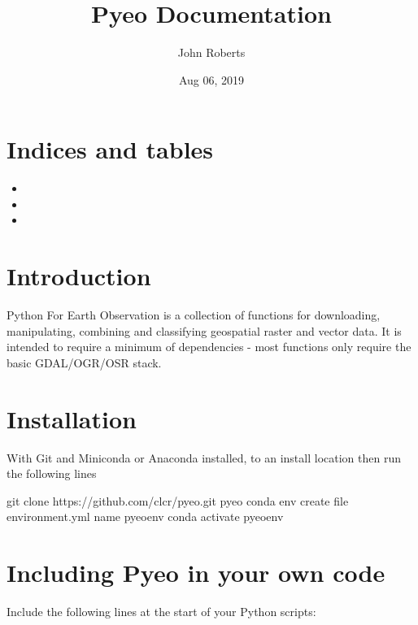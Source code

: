 \documentclass[letterpaper,10pt,english]{sphinxmanual}
\title{Pyeo Documentation}
\date{Aug 06, 2019}
\author{John Roberts}
\begin{document}
\pagestyle{empty}
\sphinxmaketitle
\pagestyle{plain}
\sphinxtableofcontents
\pagestyle{normal}
\label{\detokenize{index::doc}}



\chapter{Indices and tables}
\label{\detokenize{index:indices-and-tables}}\begin{itemize}
\item {} 

\item {} 

\item {} 

\end{itemize}


\chapter{Introduction}
\label{\detokenize{index:introduction}}
Python For Earth Observation is a collection of functions for downloading, manipulating, combining and classifying
geospatial raster and vector data. It is intended to require a minimum of dependencies - most functions only require
the basic GDAL/OGR/OSR stack.


\chapter{Installation}
\label{\detokenize{index:installation}}
With Git and Miniconda or Anaconda installed,  to an install location then run the following lines

\begin{sphinxVerbatim}[commandchars=\\\{\}]
git clone https://github.com/clcr/pyeo.git
 pyeo
conda env create \PYGZhy{}\PYGZhy{}file environment.yml \PYGZhy{}\PYGZhy{}name pyeo\PYGZus{}env
conda activate pyeo\PYGZus{}env
\end{sphinxVerbatim}


\chapter{Including Pyeo in your own code}
\label{\detokenize{index:including-pyeo-in-your-own-code}}
Include the following lines at the start of your Python scripts:
\end{document}
